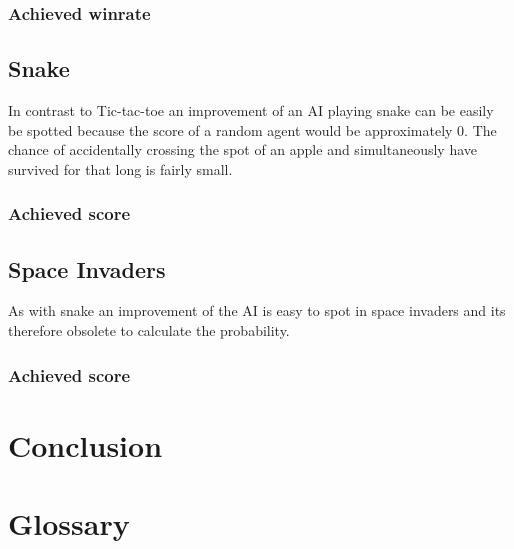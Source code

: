 \documentclass[12pt]{article}
\begin{document}
\subsubsection{Achieved winrate}
\subsection{Snake}
In contrast to Tic-tac-toe an improvement of an AI playing snake can be easily be spotted because the score of a random agent would be approximately $0$. The chance of accidentally crossing the spot of an apple and simultaneously have survived for that long is fairly small.   
\subsubsection{Achieved score}
\subsection{Space Invaders}
As with snake an improvement of the AI is easy to spot in space invaders and its therefore obsolete to calculate the probability. 
\subsubsection{Achieved score}
\section{Conclusion}
\section{Glossary}


\newpage

\listoffigures
\end{document}
